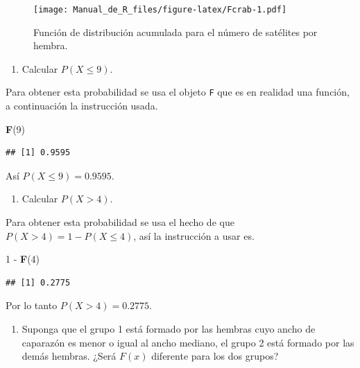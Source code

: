 \documentclass[10pt,]{krantz}
\makeatletter
\newenvironment{Shaded}{\begin{snugshade}}{\end{snugshade}}
\newcommand{\KeywordTok}[1]{\textcolor[rgb]{0.13,0.29,0.53}{\textbf{{#1}}}}
\newcommand{\DecValTok}[1]{\textcolor[rgb]{0.00,0.00,0.81}{{#1}}}
\newcommand{\StringTok}[1]{\textcolor[rgb]{0.31,0.60,0.02}{{#1}}}
\newcommand{\NormalTok}[1]{{#1}}
\providecommand{\tightlist}{%
  \setlength{\itemsep}{0pt}\setlength{\parskip}{0pt}}
\newenvironment{kframe}{%
\medskip{}
\setlength{\fboxsep}{.8em}
 \def\at@end@of@kframe{}%
 \ifinner\ifhmode%
  \def\at@end@of@kframe{\end{minipage}}%
  \begin{minipage}{\columnwidth}%
 \fi\fi%
 \def\FrameCommand##1{\hskip\@totalleftmargin \hskip-\fboxsep
 \colorbox{shadecolor}{##1}\hskip-\fboxsep
     \hskip-\linewidth \hskip-\@totalleftmargin \hskip\columnwidth}%
 \MakeFramed {\advance\hsize-\width
   \@totalleftmargin\z@ \linewidth\hsize
   \@setminipage}}%
 {\par\unskip\endMakeFramed%
 \at@end@of@kframe}
\renewenvironment{Shaded}{\begin{kframe}}{\end{kframe}}
\makeatother
\begin{document}
\begin{figure}[htbp]
\centering
\texttt{[image: Manual\_de\_R\_files/figure-latex/Fcrab-1.pdf]}
\caption{\label{fig:Fcrab}Función de distribución acumulada para el número
de satélites por hembra.}
\end{figure}

\begin{enumerate}
\def\labelenumi{\arabic{enumi})}
\setcounter{enumi}{2}
\tightlist
\item
  Calcular \(P(X \leq 9)\).
\end{enumerate}

Para obtener esta probabilidad se usa el objeto \texttt{F} que es en
realidad una función, a continuación la instrucción usada.

\begin{Shaded}
\begin{Highlighting}[]
\KeywordTok{F}\NormalTok{(}\DecValTok{9}\NormalTok{)}
\end{Highlighting}
\end{Shaded}

\begin{verbatim}
## [1] 0.9595
\end{verbatim}

Así \(P(X \leq 9)=0.9595\).

\begin{enumerate}
\def\labelenumi{\arabic{enumi})}
\setcounter{enumi}{3}
\tightlist
\item
  Calcular \(P(X > 4)\).
\end{enumerate}

Para obtener esta probabilidad se usa el hecho de que
\(P(X > 4) = 1 - P(X \leq 4)\), así la instrucción a usar es.

\begin{Shaded}
\begin{Highlighting}[]
\DecValTok{1} \NormalTok{-}\StringTok{ }\KeywordTok{F}\NormalTok{(}\DecValTok{4}\NormalTok{)}
\end{Highlighting}
\end{Shaded}

\begin{verbatim}
## [1] 0.2775
\end{verbatim}

Por lo tanto \(P(X > 4)=0.2775\).

\begin{enumerate}
\def\labelenumi{\arabic{enumi})}
\setcounter{enumi}{4}
\tightlist
\item
  Suponga que el grupo 1 está formado por las hembras cuyo ancho de
  caparazón es menor o igual al ancho mediano, el grupo 2 está formado
  por las demás hembras. ¿Será \(F(x)\) diferente para los dos grupos?
\end{enumerate}
\end{document}

